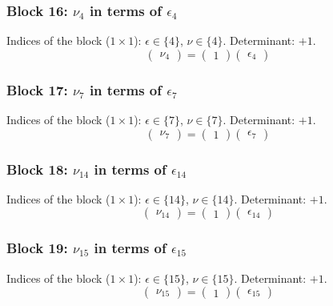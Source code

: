 \subsubsection{Block 16: $\nu_{4}$ in terms of $\epsilon_{4}$}
Indices of the block ($1\times 1$): $\epsilon \in \{4\}$, $\nu \in \{4\}$.
Determinant: $+1$.
\[
\begin{pmatrix}
\nu_{4}
\end{pmatrix}
=
\begin{pmatrix}
1
\end{pmatrix}
\begin{pmatrix}
\epsilon_{4}
\end{pmatrix}
\]

\subsubsection{Block 17: $\nu_{7}$ in terms of $\epsilon_{7}$}
Indices of the block ($1\times 1$): $\epsilon \in \{7\}$, $\nu \in \{7\}$.
Determinant: $+1$.
\[
\begin{pmatrix}
\nu_{7}
\end{pmatrix}
=
\begin{pmatrix}
1
\end{pmatrix}
\begin{pmatrix}
\epsilon_{7}
\end{pmatrix}
\]

\subsubsection{Block 18: $\nu_{14}$ in terms of $\epsilon_{14}$}
Indices of the block ($1\times 1$): $\epsilon \in \{14\}$, $\nu \in \{14\}$.
Determinant: $+1$.
\[
\begin{pmatrix}
\nu_{14}
\end{pmatrix}
=
\begin{pmatrix}
1
\end{pmatrix}
\begin{pmatrix}
\epsilon_{14}
\end{pmatrix}
\]

\subsubsection{Block 19: $\nu_{15}$ in terms of $\epsilon_{15}$}
Indices of the block ($1\times 1$): $\epsilon \in \{15\}$, $\nu \in \{15\}$.
Determinant: $+1$.
\[
\begin{pmatrix}
\nu_{15}
\end{pmatrix}
=
\begin{pmatrix}
1
\end{pmatrix}
\begin{pmatrix}
\epsilon_{15}
\end{pmatrix}
\]

